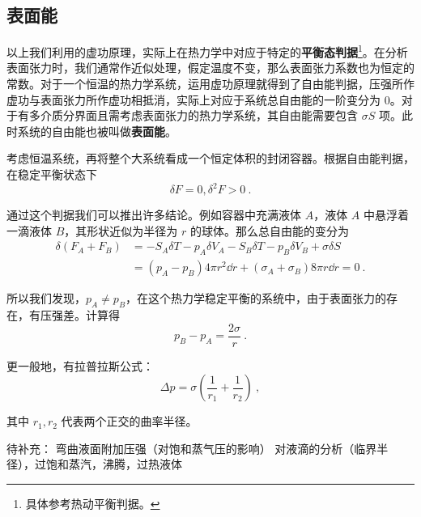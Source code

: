 \subsection{表面能}
以上我们利用的虚功原理，实际上在热力学中对应于特定的\textbf{平衡态判据}\footnote{具体参考热动平衡判据。}。在分析表面张力时，我们通常作近似处理，假定温度不变，那么表面张力系数也为恒定的常数。对于一个恒温的热力学系统，运用虚功原理就得到了自由能判据，压强所作虚功与表面张力所作虚功相抵消，实际上对应于系统总自由能的一阶变分为 $0$。对于有多介质分界面且需考虑表面张力的热力学系统，其自由能需要包含 $\sigma S$ 项。此时系统的自由能也被叫做\textbf{表面能}。

考虑恒温系统，再将整个大系统看成一个恒定体积的封闭容器。根据自由能判据，在稳定平衡状态下
\begin{equation}
\delta F=0,\delta^2 F>0~.
\end{equation}

通过这个判据我们可以推出许多结论。例如容器中充满液体 $A$，液体 $A$ 中悬浮着一滴液体 $B$，其形状近似为半径为 $r$ 的球体。那么总自由能的变分为
\begin{align}
\delta(F_A+F_B)&=-S_A\delta T-p_A\delta V_A-S_B\delta T-p_B\delta V_B+\sigma\delta S\\
&=(p_A-p_B)4\pi r^2\dd r + (\sigma_A+\sigma_B)8\pi r\dd r=0~.
\end{align}

所以我们发现，$p_A\neq p_B$，在这个热力学稳定平衡的系统中，由于表面张力的存在，有压强差。计算得
\begin{equation}
p_B-p_A=\frac{2\sigma}{r}~.
\end{equation}

更一般地，有拉普拉斯公式：
\begin{equation}\label{eq_sftens_1}
\Delta p = \sigma \left(\frac{1}{r_1}+\frac{1}{r_2}\right)~,
\end{equation}

其中 $r_1,r_2$ 代表两个正交的曲率半径。

待补充：
弯曲液面附加压强（对饱和蒸气压的影响）
对液滴的分析（临界半径），过饱和蒸汽，沸腾，过热液体
